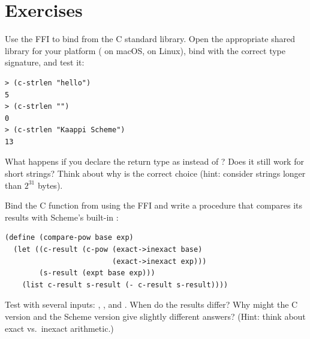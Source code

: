 \section*{Exercises}

\begin{exercise}
Use the FFI to bind  from the C standard library. Open the appropriate shared library for your platform ( on macOS,  on Linux), bind  with the correct type signature, and test it:

\begin{lstlisting}[style=repl]
> (c-strlen "hello")
5
> (c-strlen "")
0
> (c-strlen "Kaappi Scheme")
13
\end{lstlisting}

What happens if you declare the return type as  instead of ? Does it still work for short strings? Think about why  is the correct choice (hint: consider strings longer than $2^{31}$ bytes).
\end{exercise}

\begin{exercise}
Bind the C function  from  using the FFI and write a procedure that compares its results with Scheme's built-in :

\begin{lstlisting}
(define (compare-pow base exp)
  (let ((c-result (c-pow (exact->inexact base)
                         (exact->inexact exp)))
        (s-result (expt base exp)))
    (list c-result s-result (- c-result s-result))))
\end{lstlisting}

Test with several inputs: , , and . When do the results differ? Why might the C version and the Scheme version give slightly different answers? (Hint: think about exact vs.\ inexact arithmetic.)
\end{exercise}

